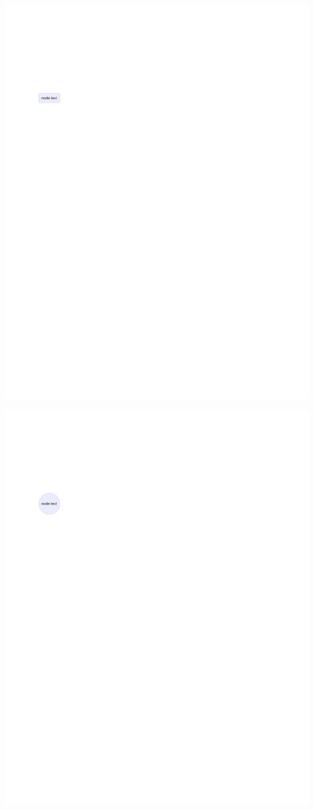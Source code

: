\documentclass[
  letterpaper,
]{scrbook}
\begin{document}
\includegraphics{./summary_files/figure-pdf/unnamed-chunk-4-2.pdf}

\includegraphics{./summary_files/figure-pdf/unnamed-chunk-4-3.pdf}
\end{document}
